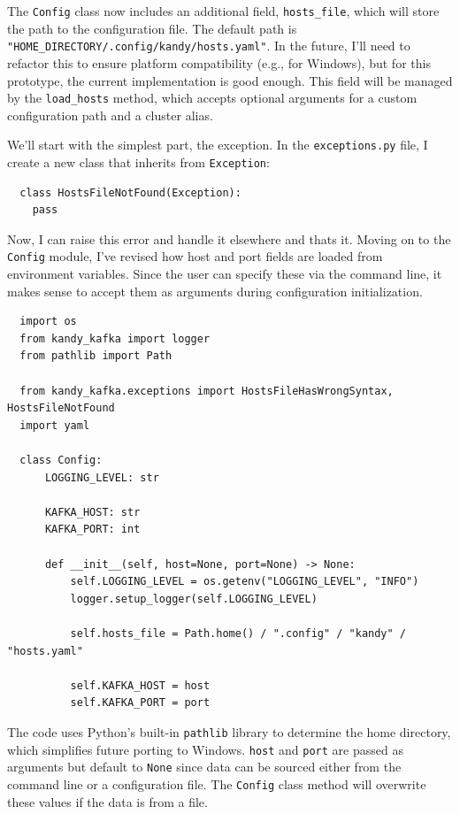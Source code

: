 \documentclass[10pt , a4paper]{report}
\newenvironment{code}{\captionsetup{type=listing}}{}
\begin{document}
The \texttt{Config} class now includes an additional field, \texttt{hosts\_file}, which will store the path to the configuration file. The default path is \texttt{"HOME\_DIRECTORY/.config/kandy/hosts.yaml"}. In the future, I'll need to refactor this to ensure platform compatibility (e.g., for Windows), but for this prototype, the current implementation is good enough. This field will be managed by the \texttt{load\_hosts} method, which accepts optional arguments for a custom configuration path and a cluster alias.

We’ll start with the simplest part, the exception. In the \texttt{exceptions.py} file, I create a new class that inherits from \texttt{Exception}:

\begin{code}
  \begin{verbatim}
  class HostsFileNotFound(Exception):
    pass
  \end{verbatim}
\end{code}

Now, I can raise this error and handle it elsewhere and thats it. Moving on to the \texttt{Config} module, I've revised how host and port fields are loaded from environment variables. Since the user can specify these via the command line, it makes sense to accept them as arguments during configuration initialization.

\begin{code}
  \begin{verbatim}
  import os
  from kandy_kafka import logger
  from pathlib import Path

  from kandy_kafka.exceptions import HostsFileHasWrongSyntax, HostsFileNotFound
  import yaml

  class Config:
      LOGGING_LEVEL: str

      KAFKA_HOST: str
      KAFKA_PORT: int

      def __init__(self, host=None, port=None) -> None:
          self.LOGGING_LEVEL = os.getenv("LOGGING_LEVEL", "INFO")
          logger.setup_logger(self.LOGGING_LEVEL)

          self.hosts_file = Path.home() / ".config" / "kandy" / "hosts.yaml"

          self.KAFKA_HOST = host
          self.KAFKA_PORT = port
  \end{verbatim}
\end{code}

The code uses Python's built-in \texttt{pathlib} library to determine the home directory, which simplifies future porting to Windows. \texttt{host} and \texttt{port} are passed as arguments but default to \texttt{None} since data can be sourced either from the command line or a configuration file. The \texttt{Config} class method will overwrite these values if the data is from a file.
\end{document}
